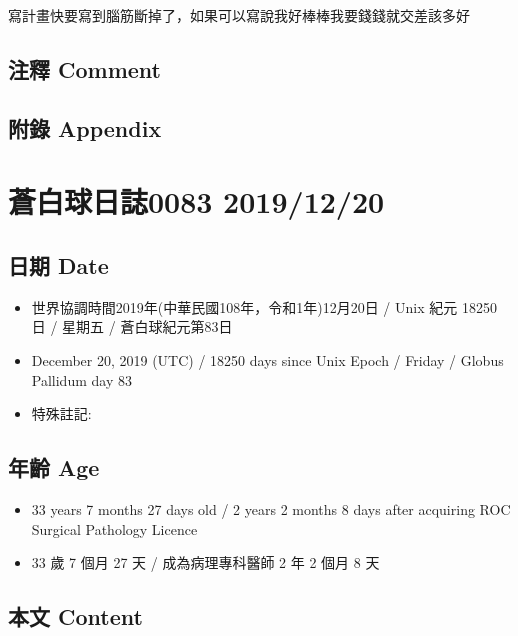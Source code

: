 \documentclass[
]{article}
\providecommand{\tightlist}{%
  \setlength{\itemsep}{0pt}\setlength{\parskip}{0pt}}
\begin{document}
寫計畫快要寫到腦筋斷掉了，如果可以寫說我好棒棒我要錢錢就交差該多好

\hypertarget{ux6ce8ux91cb-comment-17}{%
\subsection{注釋 Comment}\label{ux6ce8ux91cb-comment-17}}

\hypertarget{ux9644ux9304-appendix-18}{%
\subsection{附錄 Appendix}\label{ux9644ux9304-appendix-18}}

\hypertarget{ux84bcux767dux7403ux65e5ux8a8c0083-20191220}{%
\section{蒼白球日誌0083
2019/12/20}\label{ux84bcux767dux7403ux65e5ux8a8c0083-20191220}}

\hypertarget{ux65e5ux671f-date-19}{%
\subsection{日期 Date}\label{ux65e5ux671f-date-19}}

\begin{itemize}
\tightlist
\item
  世界協調時間2019年(中華民國108年，令和1年)12月20日 / Unix 紀元 18250
  日 / 星期五 / 蒼白球紀元第83日
\item
  December 20, 2019 (UTC) / 18250 days since Unix Epoch / Friday /
  Globus Pallidum day 83
\item
  特殊註記:
\end{itemize}

\hypertarget{ux5e74ux9f61-age-19}{%
\subsection{年齡 Age}\label{ux5e74ux9f61-age-19}}

\begin{itemize}
\tightlist
\item
  33 years 7 months 27 days old / 2 years 2 months 8 days after
  acquiring ROC Surgical Pathology Licence
\item
  33 歲 7 個月 27 天 / 成為病理專科醫師 2 年 2 個月 8 天
\end{itemize}

\hypertarget{ux672cux6587-content-19}{%
\subsection{本文 Content}\label{ux672cux6587-content-19}}
\end{document}
